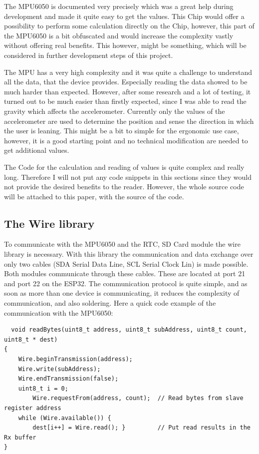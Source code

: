 The MPU6050 is documented very precisely which was a great help during development and made it quite easy to get the values. This Chip would offer a possibility to perform some calculation directly on the Chip, however, this part of the MPU6050 is a bit obfuscated and would increase the complexity vastly without offering real benefits. This however, might be something, which will be considered in further development steps of this project.

The MPU has a very high complexity and it was quite a challenge to understand all the data, that the device provides. Especially reading the data showed to be much harder than expected. However, after some research and a lot of testing, it turned out to be much easier than firstly expected, since I was able to read the gravity which affects the accelerometer.
Currently only the values of the accelerometer are used to determine the position and sense the direction in which the user is leaning. This might be a bit to simple for the ergonomic use case, however, it is a good starting point and no technical modification are needed to get additional values.

The Code for the calculation and reading of values is quite complex and really long. Therefore I will not put any code snippets in this sections since they would not provide the desired benefits to the reader. However, the whole source code will be attached to this paper, with the source of the code. \cite{TDKAttra32:online}

\newpage

\subsection{The Wire library}

To communicate with the MPU6050 and the RTC, SD Card module the wire library is necessary. With this library the communication and data exchange over only two cables (SDA Serial Data Line, SCL Serial Clock Lin) is made possible. Both modules communicate through these cables. These are located at port 21 and port 22 on the ESP32. The communication protocol is quite simple, and as soon as more than one device is communicating, it reduces the complexity of communication, and also soldering. Here a quick code example of the communication with the MPU6050:
\begin{lstlisting}
  void readBytes(uint8_t address, uint8_t subAddress, uint8_t count, uint8_t * dest)
{  
	Wire.beginTransmission(address);   
	Wire.write(subAddress);            
	Wire.endTransmission(false);       
	uint8_t i = 0;
        Wire.requestFrom(address, count);  // Read bytes from slave register address 
	while (Wire.available()) {
        dest[i++] = Wire.read(); }         // Put read results in the Rx buffer
}
\end{lstlisting}

